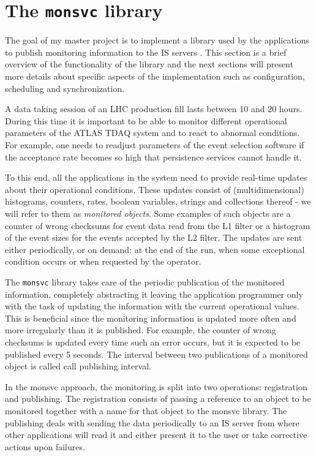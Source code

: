 \chapter{The {\tt monsvc} library} %
\label{Capitolul2}

The goal of my master project is to implement a library used by the applications to publish monitoring information to the IS servers \citep{kolosinformation}. This section is a brief overview of the functionality of the library and the next sections will present more details about specific aspects of the implementation such as configuration, scheduling and synchronization.

A data taking session of an LHC production fill lasts between 10 and 20 hours. During this time it is important to be able to monitor different operational parameters of the ATLAS TDAQ system and to react to abnormal conditions. For example, one needs to readjust parameters of the event selection software if the acceptance rate becomes so high that persistence services cannot handle it. 

To this end, all the applications in the system need to provide real-time updates about their operational conditions. These updates consist of (multidimensional) histograms, counters, rates, boolean variables, strings and collections thereof - we will refer to them as \emph{monitored objects}. Some examples of such objects are a counter of wrong checksums for event data read from the L1 filter or a histogram of the event sizes for the events accepted by the L2 filter. The updates are sent either periodically, or on demand: at the end of the run, when some exceptional condition occurs or when requested by the operator.

The {\tt monsvc} library takes care of the periodic publication of the monitored information, completely abstracting it leaving the application programmer only with the task of updating the information with the current operational values. This is beneficial since the monitoring information is updated more often and more irregularly than it is published. For example, the counter of wrong checksums is updated every time such an error occurs, but it is expected to be published every 5 seconds. The interval between two publications of a monitored object is called call publishing interval.

In the monsvc approach, the monitoring is split into two operations: registration and publishing. The registration consists of passing a reference to an object to be monitored together with a name for that object to the monsvc library. The publishing deals with sending the data periodically to an IS server from where other applications will read it and either present it to the user or take corrective actions upon failures. 

